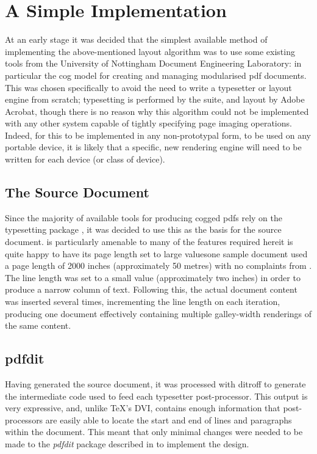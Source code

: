 \section{A Simple Implementation}
At an early stage it was decided that the simplest available method of implementing the above-mentioned layout algorithm was to use some existing tools from the University of Nottingham Document Engineering Laboratory: in particular the \gls{cog} model\cite{Bagley2003} for creating and managing modularised \gls{pdf} documents. This was chosen specifically to avoid the need to write a typesetter or layout engine from scratch; typesetting is performed by the \troff{} suite, and layout by Adobe Acrobat, though there is no reason why this algorithm could not be implemented with any other system capable of tightly specifying page imaging operations. Indeed, for this to be implemented in any non-prototypal form, \ie{} to be used on any portable device, it is likely that a specific, new rendering engine will need to be written for each device (or class of device).

\subsection{The Source Document}\label{sec:srcdoc}
Since the majority of available tools for producing \gls{cog}ged \gls{pdf}s rely on the typesetting package \ditroff{}, it was decided to use this as the basis for the source document. \Ditroff{} is particularly amenable to many of the features required here\ed{}it is quite happy to have its page length set to large values\ed{}one sample document used a page length of 2000 inches (approximately 50 metres) with no complaints from \ditroff{}. The line length was set to a small value (approximately two inches) in order to produce a narrow column of text. Following this, the actual document content was inserted several times, incrementing the line length on each iteration, producing one document effectively containing multiple galley-width renderings of the same content.

\subsection{pdfdit}
Having generated the source document, it was processed with ditroff to generate the intermediate code used to feed each typesetter post-pro\-cessor. This output is very expressive, and, unlike \TeX's DVI, contains enough information that post-processors are easily able to locate the start and end of lines and paragraphs within the document. This meant that only minimal changes were needed to be made to the \emph{pdfdit} package described in \cite{Bagley2003} to implement the design.

